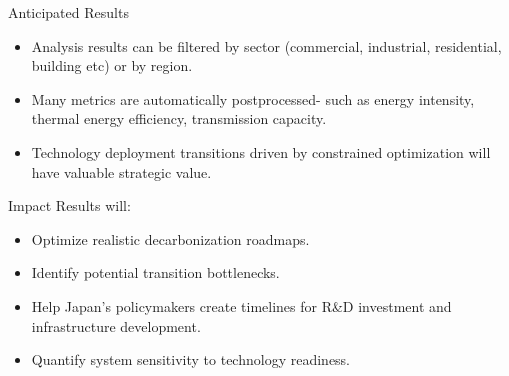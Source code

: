 \documentclass[final]{beamer}
\newlength{\onecolwid}
\newlength{\threecolwid}
\begin{document}
\begin{frame}[t]
\begin{columns}[t,totalwidth=\threecolwid]


\begin{column}{\onecolwid} %



\begin{block}{Anticipated Results}

 \begin{itemize}
   \item Analysis results can be filtered by sector (commercial, industrial, residential, building etc) or by region.
   
   \item Many metrics are automatically postprocessed- such as energy intensity, thermal energy efficiency, transmission capacity. 
   
   \item Technology deployment transitions driven by constrained optimization will have valuable strategic value.    
 
 
 \end{itemize}  
 
 	
\end{block}







        \begin{alertblock}{Impact}
        \large Results will:
	\begin{itemize}
        \item {Optimize realistic decarbonization roadmaps.}
        \item {Identify potential transition bottlenecks.}
        \item {Help Japan's policymakers create timelines for R\&D investment and infrastructure development.}
        \item {Quantify system sensitivity to technology readiness.}
	\end{itemize}
        \end{alertblock}
   


\end{column}
\end{columns}
\end{frame}
\end{document}
